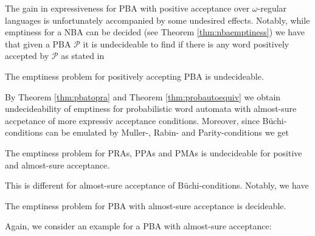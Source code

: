 The gain in expressiveness for \ac{PBA} with positive acceptance over 
$\omega$-regular languages is unfortunately accompanied by some undesired 
effects. Notably, while emptiness for a \ac{NBA} can be decided (see Theorem 
\ref{thm:nbaemptiness}) we have that given a \ac{PBA} $\mathcal{P}$ it is 
undecideable to find if there is any word positively accepted by $\mathcal{P}$ 
as stated in
\begin{theorem}
  \cite[Theorem 2]{DecProblemsForProbAuto}
  The emptiness problem for positively accepting \ac{PBA} is undecideable.
  \label{thm:emptinesspospba}
\end{theorem}
By Theorem \ref{thm:pbatopra} and Theorem \ref{thm:probautoequiv} we obtain
undecideability of emptiness for probabilistic word automata with 
almost-sure accpetance of more expressiv acceptance conditions. Moreover, since 
Büchi-conditions can be emulated by Muller-, Rabin- and Parity-conditions we
get
\begin{corollary}
  The emptiness problem for \acp{PRA}, \acp{PPA} and \acp{PMA} is undecideable
  for positive and almost-sure acceptance.
  \label{cor:emptinessstrongalmostsureprob}
\end{corollary}
This is different for almost-sure acceptance of Büchi-conditions. Notably, we
have
\begin{theorem}
  \cite[Theorem 6]{DecProblemsForProbAuto}
  The emptiness problem for \ac{PBA} with almost-sure acceptance is decideable.
  \label{thm:emptinessalmostsurepba}
\end{theorem}
Again, we consider an example for a \ac{PBA} with almost-sure acceptance:
